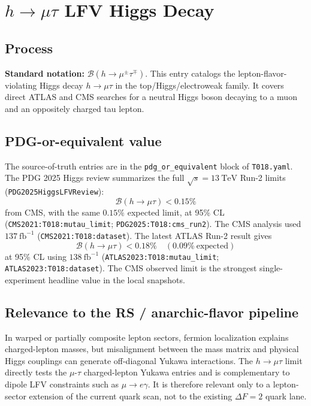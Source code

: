 
\section{\texorpdfstring{\(h\to\mu\tau\)}{h -> mu tau} LFV Higgs Decay}

\subsection*{Process}
\textbf{Standard notation:} \(\mathcal{B}(h\to\mu^\pm\tau^\mp)\).
This entry catalogs the lepton-flavor-violating Higgs decay \(h\to\mu\tau\) in
the top/Higgs/electroweak family.  It covers direct ATLAS and CMS searches for
a neutral Higgs boson decaying to a muon and an oppositely charged tau lepton.

\subsection*{PDG-or-equivalent value}
The source-of-truth entries are in the \texttt{pdg\_or\_equivalent} block of
\texttt{T018.yaml}.  The PDG 2025 Higgs review summarizes the full
\(\sqrt{s}=13~\mathrm{TeV}\) Run-2 limits
(\texttt{PDG2025HiggsLFVReview}):
\[
  \mathcal{B}(h\to\mu\tau) < 0.15\%
\]
from CMS, with the same \(0.15\%\) expected limit, at 95\% CL
(\texttt{CMS2021:T018:mutau\_limit}; \texttt{PDG2025:T018:cms\_run2}).  The
CMS analysis used \(137~\mathrm{fb}^{-1}\)
(\texttt{CMS2021:T018:dataset}).  The latest ATLAS Run-2 result gives
\[
  \mathcal{B}(h\to\mu\tau) < 0.18\% \quad (0.09\%\ \mathrm{expected})
\]
at 95\% CL using \(138~\mathrm{fb}^{-1}\)
(\texttt{ATLAS2023:T018:mutau\_limit};
\texttt{ATLAS2023:T018:dataset}).  The CMS observed limit is the strongest
single-experiment headline value in the local snapshots.

\subsection*{Relevance to the RS / anarchic-flavor pipeline}
In warped or partially composite lepton sectors, fermion localization explains
charged-lepton masses, but misalignment between the mass matrix and physical
Higgs couplings can generate off-diagonal Yukawa interactions.  The
\(h\to\mu\tau\) limit directly tests the \(\mu\)-\(\tau\) charged-lepton
Yukawa entries and is complementary to dipole LFV constraints such as
\(\mu\to e\gamma\).  It is therefore relevant only to a lepton-sector extension
of the current quark scan, not to the existing \(\Delta F=2\) quark lane.

